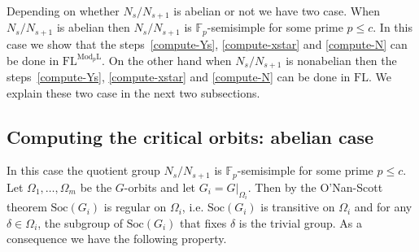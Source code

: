 \documentclass[11pt]{madras}%
\theoremstyle{remark}
\newcommand{\ModkL}[1]{{\ensuremath{\mathrm{Mod}_{#1}\mathrm{L}}}}
\newcommand{\pr}[2]{{\ensuremath{\left.{#1}\right\vert_{#2}}}}
\newcommand{\Soc}[1]{{\ensuremath{\mathrm{Soc}\left(#1\right)}}}
\begin{document}
Depending on whether $N_s/N_{s+1}$ is abelian or not we have two case.
When $N_s/N_{s+1}$ is abelian then $N_s/N_{s+1}$ is
$\mathbb{F}_p$-semisimple for some prime $p \leq c$. In this case we
show that the steps~\ref{compute-Ys}, \ref{compute-xstar} and
\ref{compute-N} can be done in $\mathrm{FL}^{\ModkL{p}}$. On the other
hand when $N_s/N_{s+1}$ is nonabelian then the steps~\ref{compute-Ys},
\ref{compute-xstar} and \ref{compute-N} can be done in $\mathrm{FL}$.
We explain these two case in the next two subsections.
\subsection{Computing the critical orbits: abelian case}\label{subsect-ab-critical}

In this case the quotient group $N_s/N_{s+1}$ is
$\mathbb{F}_p$-semisimple for some prime $p \leq c$. Let
$\Omega_1,\ldots,\Omega_m$ be the $G$-orbits and let $G_i =
\pr{G}{\Omega_i}$. Then by the O'Nan-Scott theorem $\Soc{G_i}$ is
regular on $\Omega_i$, i.e. $\Soc{G_i}$ is transitive on $\Omega_i$
and for any $\delta \in \Omega_i$, the subgroup of $\Soc{G_i}$ that
fixes $\delta$ is the trivial group.  As a consequence we have the
following property.
\end{document}
